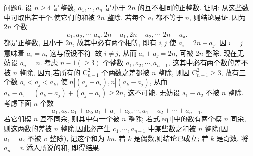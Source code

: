 问题6. 设 $n \geqslant 4$ 是整数, $a_1, \cdots, a_n$ 是小于 $2 n$ 的互不相同的正整数.
证明: 从这些数中可取出若干个,使它们的和被 $2 n$ 整除.
若每个 $a_i$ 都不等于 $n$, 则结论易证.
因为 $2 n$ 个数
$$
a_1, a_2, \cdots, a_n, 2 n-a_1, 2 n-a_2, \cdots, 2 n-a_n .
$$
都是正整数, 且小于 $2 n$, 故其中必有两个相等, 即有 $i, j$ 使 $a_i=2 n-a_j$. 因 $i= j$ 意味着 $a_i=n$, 这与假设不符, 故 $i \neq j$, 从而 $a_i+a_j=2 n$, 可被 $2 n$ 整除.
现在无妨设 $a_n=n$. 考虑 $n-1(\geqslant 3)$ 个整数 $a_1, a_2, \cdots, a_{n-1}$, 这其中必有两个数的差不被 $n$ 整除, 因为,若所有的 $\mathrm{C}_{n-1}^2$ 个两数之差都被 $n$ 整除, 则因 $\mathrm{C}_{n-1}^2 \geqslant 3$, 故有三个数 $a_i<a_j<a_k$, 使 $n\left|\left(a_j-a_i\right), n\right|\left(a_k-a_j\right)$, 从而 $a_k- a_i=\left(a_k-a_j\right)+\left(a_j-a_i\right) \geqslant 2 n$, 这不可能.
无妨设 $a_1-a_2$ 不被 $n$ 整除.
考虑下面 $n$ 个数
$$
a_1, a_2, a_1+a_2, a_1+a_2+a_3, \cdots, a_1+a_2+\cdots+a_{n-1} . \label{eq1}
$$
若它们模 $n$ 互不同余, 则其中有一个被 $n$ 整除; 若式\ref{eq1}中的数有两个模 $n$ 同余, 则这两数的差被 $n$ 整除,因此必产生 $a_1, \cdots, a_{n-1}$ 中某些数之和被 $n$ 整除(因 $a_1-a_2$ 不被 $n$ 整除), 记这个和为 $k n$. 若 $k$ 是偶数,则结论已成立; 若 $k$ 是奇数, 将 $a_n=n$ 添人所说的和, 即得结果.


